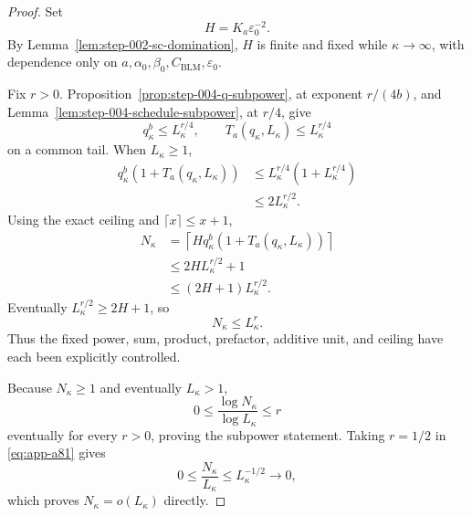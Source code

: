 \begin{proof}
Set
\begin{equation}
H=K_a\varepsilon_0^{-2}.
\label{eq:app-a83}
\end{equation}
By Lemma~\ref{lem:step-002-sc-domination}, \(H\) is finite and fixed
while \(\kappa\to\infty\), with dependence only on
\(a,\alpha_0,\beta_0,C_{\mathrm{BLM}},\varepsilon_0\).

Fix \(r>0\).  Proposition~\ref{prop:step-004-q-subpower}, at exponent
\(r/(4b)\), and Lemma~\ref{lem:step-004-schedule-subpower}, at
\(r/4\), give
\begin{equation}
q_\kappa^b\leq L_\kappa^{r/4},\qquad
T_a(q_\kappa,L_\kappa)\leq L_\kappa^{r/4}
\label{eq:app-a84}
\end{equation}
on a common tail.  When \(L_\kappa\geq1\),
\begin{equation}
\begin{aligned}
q_\kappa^b(1+T_a(q_\kappa,L_\kappa))
&\leq
L_\kappa^{r/4}(1+L_\kappa^{r/4})\\
&\leq2L_\kappa^{r/2}.
\end{aligned}
\label{eq:app-a85}
\end{equation}
Using the exact ceiling and \(\lceil x\rceil\leq x+1\),
\begin{equation}
\begin{aligned}
N_\kappa
&=\left\lceil
Hq_\kappa^b(1+T_a(q_\kappa,L_\kappa))
\right\rceil\\
&\leq2HL_\kappa^{r/2}+1\\
&\leq(2H+1)L_\kappa^{r/2}.
\end{aligned}
\label{eq:app-a86}
\end{equation}
Eventually \(L_\kappa^{r/2}\geq2H+1\), so
\begin{equation}
N_\kappa\leq L_\kappa^r.
\label{eq:app-a87}
\end{equation}
Thus the fixed power, sum, product, prefactor, additive unit, and
ceiling have each been explicitly controlled.

Because \(N_\kappa\geq1\) and eventually \(L_\kappa>1\),
\begin{equation}
0\leq\frac{\log N_\kappa}{\log L_\kappa}\leq r
\label{eq:app-a88}
\end{equation}
eventually for every \(r>0\), proving the subpower statement.
Taking \(r=1/2\) in \eqref{eq:app-a81} gives
\begin{equation}
0\leq\frac{N_\kappa}{L_\kappa}
\leq L_\kappa^{-1/2}
\longrightarrow0,
\label{eq:app-a89}
\end{equation}
which proves \(N_\kappa=o(L_\kappa)\) directly.


\end{proof}
